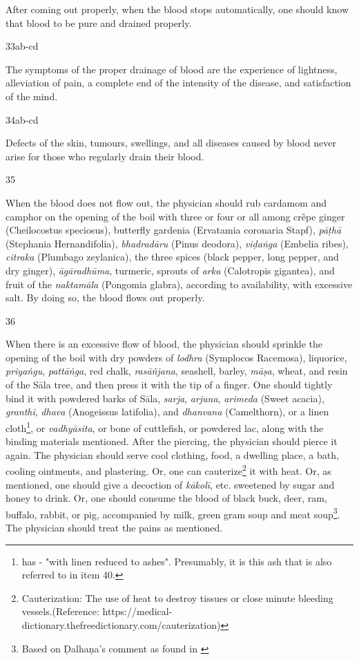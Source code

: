 \begin{translation}
After coming out properly, when the blood stops automatically, one should know that blood to be pure and drained properly.

\item[33ab-cd]

The symptoms of the proper drainage of blood are the experience of lightness, alleviation of pain, a complete end of the intensity of the disease, and satisfaction of the mind.

\item[34ab-cd] 

Defects of the skin, tumours, swellings, and all diseases caused by blood never arise for those who regularly drain their blood.

\item[35]

When the blood does not flow out, the physician should rub cardamom and camphor on the opening of the boil with three or four or all among crêpe ginger (Cheilocostus speciosus), butterfly gardenia (Ervatamia coronaria Stapf), \emph{pāṭhā} (Stephania Hernandifolia), \emph{bhadradāru} (Pinus deodora), \emph{viḍaṅga} (Embelia ribes), \emph{citraka} (Plumbago zeylanica), the three spices (black pepper, long pepper, and dry ginger), \emph{āgāradhūma}, turmeric, sprouts of \emph{arka} (Calotropis gigantea), and fruit of the \emph{naktamāla} (Pongomia glabra), according to availability, with excessive salt. By doing so, the blood flows out properly.

\item[36]

When there is an excessive flow of blood, the physician should sprinkle the opening of the boil with dry powders of \emph{lodhra} (Symplocos Racemosa), liquorice, \emph{priyaṅgu}, \emph{pattāṅga}, red chalk, \emph{rasāñjana}, seashell, barley, \emph{māṣa}, wheat, and resin of the Sāla tree, and then press it with the tip of a finger. 
One should tightly bind it with powdered barks of Sāla, \emph{sarja}, 
\emph{arjuna}, \emph{arimeda} (Sweet acacia), \emph{granthi}, \emph{dhava} 
(Anogeissus latifolia), and \emph{dhanvana} (Camelthorn), or a linen 
cloth\footnote{\cite[66]{vulgate} has  - "with linen 
reduced to ashes". Presumably, it is this ash that is also referred to in item 40.}, or 
\emph{vadhyāsita}, or bone of cuttlefish, or powdered lac, along with the binding 
materials mentioned. 
After the piercing, the physician should pierce it again. 
The physician should serve cool clothing, food, a dwelling place, a bath, cooling 
ointments, and plastering. Or, one can cauterize\footnote{Cauterization: The use of 
heat to destroy tissues or close minute bleeding vessels.(Reference: 
https://medical-dictionary.thefreedictionary.com/cauterization)} it with heat. Or, as 
mentioned, one should give a decoction of \emph{kākolī}, etc. sweetened by sugar 
and honey to drink. 
Or, one should consume the blood of black buck, deer, ram, buffalo, rabbit, or pig, accompanied by milk, green gram soup and meat soup\footnote{Based on Ḍalhaṇa's comment as found in \cite[66]{vulgate}}. 
The physician should treat the pains as mentioned. 


\end{translation}
